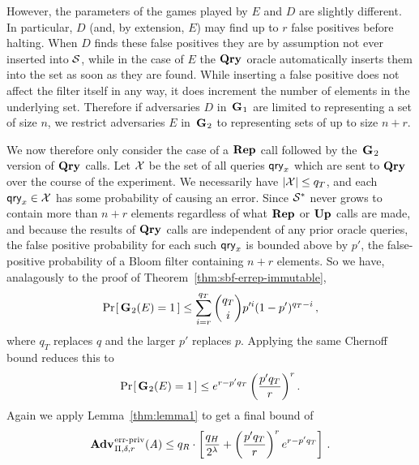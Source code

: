 However, the parameters of the games played by $E$ and $D$ are slightly
different. In particular, $D$ (and, by extension, $E$) may find up to $r$
false positives before halting. When $D$ finds these false positives they
are by assumption not ever inserted into $\mathcal{S}$, while in the case of $E$ the
$\textup{\textbf{Qry}}\hspace{0.5pt}$ oracle automatically inserts them into the set as soon as they are
found. While inserting a false positive does not affect the filter itself in any
way, it does increment the number of elements in the underlying set. Therefore
if adversaries $D$ in~$\textup{\textbf{G}}\hspace{0.5pt}_1$ are limited to representing a set of size
$n$, we restrict adversaries $E$ in~$\textup{\textbf{G}}\hspace{0.5pt}_2$ to representing sets of up to size
$n+r$.


We now therefore only consider the case of a $\textup{\textbf{Rep}}\hspace{0.5pt}$ call followed by
the~$\textup{\textbf{G}}\hspace{0.5pt}_2$ version of $\textup{\textbf{Qry}}\hspace{0.5pt}$ calls. Let $\mathcal{X}$ be the set of all queries
$\mathsf{qry}_x$ which are sent to $\textup{\textbf{Qry}}\hspace{0.5pt}$ over the course of the experiment. We
necessarily have $|\mathcal{X}| \le q_T$, and each $\mathsf{qry}_x \in \mathcal{X}$ has some
probability of causing an error. Since $\mathcal{S}^*$ never grows to contain more than
$n+r$ elements regardless of what $\textup{\textbf{Rep}}\hspace{0.5pt}$ or $\textup{\textbf{Up}}\hspace{0.5pt}$ calls are made, and because
the results of $\textup{\textbf{Qry}}\hspace{0.5pt}$ calls are independent of any prior oracle queries, the
false positive probability for each such $\mathsf{qry}_x$ is bounded
above by $p'$, the false-positive probability of a Bloom filter containing $n+r$
elements. So we have, analagously to the proof of
Theorem~\ref{thm:sbf-errep-immutable},
\begin{equation}
   \Pr\hspace{-1pt}\left[\,\textup{\textbf{G}}\hspace{0.5pt}_2(E)=1\,\right] \le
     \sum_{i=r}^{q_T} \binom{q_T}{i}p'^i(1-p')^{q_T-i} \,,
\end{equation}
where $q_T$ replaces $q$ and the larger $p'$ replaces $p$. Applying the same Chernoff bound reduces this to
\begin{equation}
   \Pr\hspace{-1pt}\left[\,\textup{\textbf{G}}\hspace{0.5pt}_2(E)=1\,\right] \le
     e^{r-p'q_T}\left(\frac{p'q_T}{r}\right)^r.
\end{equation}
%
Again we apply Lemma~\ref{thm:lemma1} to get a final bound of
\begin{equation}
  \Adv{\erreps}_{\Pi,\delta,r}(\advA) \leq
    q_R \cdot \left[
      \frac{q_H}{2^\lambda} +
      \left(\frac{p'q_T}{r}\right)^re^{r-p'q_T}
    \right] \,.
\end{equation}
